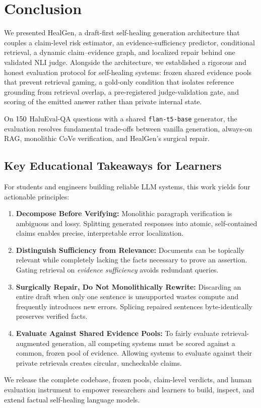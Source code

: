 \section{Conclusion}
\label{sec:conclusion}

We presented HealGen, a draft-first self-healing generation architecture that couples a claim-level risk estimator, an evidence-sufficiency predictor, conditional retrieval, a dynamic claim--evidence graph, and localized repair behind one validated NLI judge. Alongside the architecture, we established a rigorous and honest evaluation protocol for self-healing systems: frozen shared evidence pools that prevent retrieval gaming, a gold-only condition that isolates reference grounding from retrieval overlap, a pre-registered judge-validation gate, and scoring of the emitted answer rather than private internal state.

On $150$ HaluEval-QA questions with a shared \texttt{flan-t5-base} generator, the evaluation resolves fundamental trade-offs between vanilla generation, always-on RAG, monolithic CoVe verification, and HealGen's surgical repair.

\subsection{Key Educational Takeaways for Learners}
For students and engineers building reliable LLM systems, this work yields four actionable principles:
\begin{enumerate}
  \item \textbf{Decompose Before Verifying:} Monolithic paragraph verification is ambiguous and lossy. Splitting generated responses into atomic, self-contained claims enables precise, interpretable error localization.
  \item \textbf{Distinguish Sufficiency from Relevance:} Documents can be topically relevant while completely lacking the facts necessary to prove an assertion. Gating retrieval on \emph{evidence sufficiency} avoids redundant queries.
  \item \textbf{Surgically Repair, Do Not Monolithically Rewrite:} Discarding an entire draft when only one sentence is unsupported wastes compute and frequently introduces new errors. Splicing repaired sentences byte-identically preserves verified facts.
  \item \textbf{Evaluate Against Shared Evidence Pools:} To fairly evaluate retrieval-augmented generation, all competing systems must be scored against a common, frozen pool of evidence. Allowing systems to evaluate against their private retrievals creates circular, uncheckable claims.
\end{enumerate}

We release the complete codebase, frozen pools, claim-level verdicts, and human evaluation instrument to empower researchers and learners to build, inspect, and extend factual self-healing language models.
